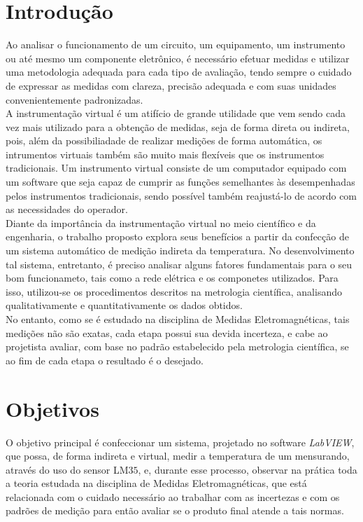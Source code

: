 \documentclass[14pt, oneside]{book}
\newcommand\tab[1][1cm]{\hspace*{#1}}
\theoremstyle{definition}
\begin{document}
    \tableofcontents
    
        \chapter{Introdução}
            \tab Ao analisar o funcionamento de um circuito, um equipamento, um instrumento ou até mesmo um componente eletrônico, é necessário efetuar medidas e utilizar uma metodologia adequada para cada tipo de avaliação, tendo sempre o cuidado de expressar as medidas com clareza, precisão adequada e com suas unidades convenientemente padronizadas. \\
            \tab A instrumentação virtual é um atifício de grande utilidade que vem sendo cada vez
            mais utilizado para a obtenção de medidas, seja de forma direta ou indireta, pois, além da
            possibiliadade de realizar medições de forma automática, os intrumentos virtuais também
            são muito mais flexíveis que os instrumentos tradicionais. Um instrumento virtual consiste
            de um computador equipado com um software que seja capaz de cumprir as funções
            semelhantes às desempenhadas pelos instrumentos tradicionais, sendo possível também
            reajustá-lo de acordo com as necessidades do operador. \\
            \tab Diante da importância da instrumentação virtual no meio científico e da engenharia, o
            trabalho proposto explora seus benefícios a partir da confecção de um sistema automático
            de medição indireta da temperatura. No desenvolvimento tal sistema, entretanto, é preciso
            analisar alguns fatores fundamentais para o seu bom funcionameto, tais como a rede
            elétrica e os componetes utilizados. Para isso, utilizou-se os procedimentos descritos na
            metrologia científica, analisando qualitativamente e quantitativamente os dados obtidos. \\
            \tab No entanto, como se é estudado na disciplina de Medidas Eletromagnéticas, tais medições não são exatas, cada etapa possui sua devida incerteza, e cabe ao projetista avaliar, com base no padrão estabelecido pela metrologia científica, se ao fim de cada etapa o resultado é o desejado.
              
        \chapter{Objetivos}
            \tab O objetivo principal é confeccionar um sistema, projetado no software \textit{LabVIEW}, que possa, de forma indireta e virtual, medir a temperatura de um mensurando, através do uso do sensor LM$35$, e, durante esse processo, observar na prática toda a teoria estudada na disciplina de Medidas Eletromagnéticas, que está relacionada com o cuidado necessário ao trabalhar com as incertezas e com os padrões de medição para então avaliar se o produto final atende a tais normas.
            
\end{document}
